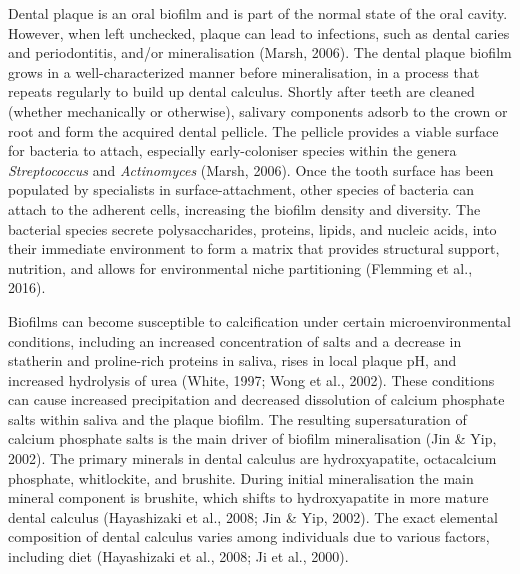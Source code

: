 \documentclass[
]{article}
\begin{document}
Dental plaque is an oral biofilm and is part of the normal state of the
oral cavity. However, when left unchecked, plaque can lead to
infections, such as dental caries and periodontitis, and/or
mineralisation (Marsh, 2006). The dental plaque biofilm grows in a
well-characterized manner before mineralisation, in a process that
repeats regularly to build up dental calculus. Shortly after teeth are
cleaned (whether mechanically or otherwise), salivary components adsorb
to the crown or root and form the acquired dental pellicle. The pellicle
provides a viable surface for bacteria to attach, especially
early-coloniser species within the genera \emph{Streptococcus} and
\emph{Actinomyces} (Marsh, 2006). Once the tooth surface has been
populated by specialists in surface-attachment, other species of
bacteria can attach to the adherent cells, increasing the biofilm
density and diversity. The bacterial species secrete polysaccharides,
proteins, lipids, and nucleic acids, into their immediate environment to
form a matrix that provides structural support, nutrition, and allows
for environmental niche partitioning (Flemming et al., 2016).

Biofilms can become susceptible to calcification under certain
microenvironmental conditions, including an increased concentration of
salts and a decrease in statherin and proline-rich proteins in saliva,
rises in local plaque pH, and increased hydrolysis of urea (White, 1997;
Wong et al., 2002). These conditions can cause increased precipitation
and decreased dissolution of calcium phosphate salts within saliva and
the plaque biofilm. The resulting supersaturation of calcium phosphate
salts is the main driver of biofilm mineralisation (Jin \& Yip, 2002).
The primary minerals in dental calculus are hydroxyapatite, octacalcium
phosphate, whitlockite, and brushite. During initial mineralisation the
main mineral component is brushite, which shifts to hydroxyapatite in
more mature dental calculus (Hayashizaki et al., 2008; Jin \& Yip,
2002). The exact elemental composition of dental calculus varies among
individuals due to various factors, including diet (Hayashizaki et al.,
2008; Ji et al., 2000).
\end{document}
